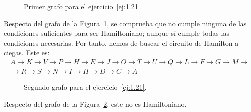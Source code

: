\begin{ejercicio}
\begin{figure}
        
        \caption{Primer grafo para el ejercicio~\ref{ej:1.21}.}
        \label{fig:1.21_1}
    \end{figure}

    Respecto del grafo de la Figura~\ref{fig:1.21_1}, se comprueba que no cumple ninguna de las condiciones suficientes para ser Hamiltoniano; aunque sí cumple todas las condiciones necesarias. Por tanto, hemos de buscar el circuito de Hamilton a ciegas. Este es:
    \begin{multline*}
        A\to K\to V\to P\to H\to E\to J\to O\to T\to U\to Q\to L\to F\to G\to M\to\\\to R\to S\to N\to I\to H\to D\to C\to A
    \end{multline*}


    \begin{figure}
        \centering
        
        
        \caption{Segundo grafo para el ejercicio~\ref{ej:1.21}.}
        \label{fig:1.21_2}
    \end{figure}

    Respecto del grafo de la Figura~\ref{fig:1.21_2}, este no es Hamiltoniano.
\end{ejercicio}

